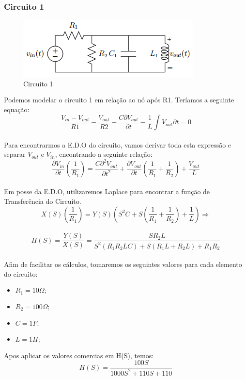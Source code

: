 \documentclass[a4paper, 12pt]{article}
\begin{document}
			\subsubsection{Circuito 1}
			\begin{figure}[!ht]
				\centering
				\includegraphics{img/circuito1.png}
				\caption{Circuito 1}	
			\end{figure}			
			Podemos modelar o circuito 1 em relação ao nó após R1. Teríamos a seguinte equação: \\
			\[
				\frac{V_{in} - V_{out}}{R1} - \frac{V_{out}}{R2} - \frac{C\partial V_{out}}{\partial t} - \frac{1}{L} \int V_{out}{\partial t} = 0
			\] 	\\
			Para encontrarmos a E.D.O do circuito, vamos derivar toda esta expressão e separar $V_{out}$ e $V_{in}$, encontrando a seguinte relação:
			\[
				\frac{\partial V_{in}}{\partial t} \left(\frac{1}{R_{1}}\right) = \frac{C \partial^{2} V_{out}}{\partial t^{2}} + \frac{\partial V_{out}}{\partial t} \left(\frac{1}{R_{1}} + \frac{1}{R_{2}} \right) + \frac{V_{out}}{L}
			\] 	\\			
			Em posse da E.D.O, utilizaremos Laplace para encontrar a função de Transferência do Circuito.
			\[
				X(S) \left(\frac{1}{R_{1}}\right) = Y(S)\left(S^{2}C + S \left(\frac{1}{R_{1}} + \frac{1}{R_{2}}\right) + \frac{1}{L} \right) \Rightarrow
			\] 	\\	
			\[
				H(S) = \frac{Y(S)}{X(S)} = \frac{SR_{2}L}{S^{2}\left(R_{1}R_{2}LC\right) + S\left(R_{1}L + R_{2}L\right) + R_{1}R_{2}}
			\] 	\\		
			
			Afim de facilitar os cálculos, tomaremos os seguintes valores para cada elemento do circuito:
			 \begin{itemize}
			 	\item $R_{1} = 10\Omega;$
			 	\item $R_{2} = 100\Omega;$
			 	\item $C = 1F;$
			 	\item $L = 1H;$
			 \end{itemize}		
			 
			Apos aplicar os valores comercias em H(S), temos:
			\[
			H(S) = \frac{100S}{1000S^{2} + 110S + 110}
			\] 	\\					
			
\end{document}
